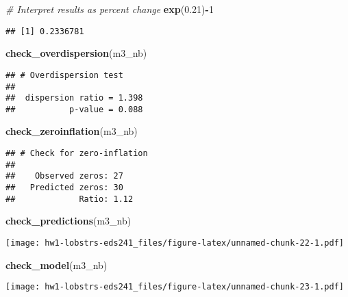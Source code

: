 \documentclass[
]{article}
\newenvironment{Shaded}{\begin{snugshade}}{\end{snugshade}}
\newcommand{\CommentTok}[1]{\textcolor[rgb]{0.56,0.35,0.01}{\textit{#1}}}
\newcommand{\DecValTok}[1]{\textcolor[rgb]{0.00,0.00,0.81}{#1}}
\newcommand{\FloatTok}[1]{\textcolor[rgb]{0.00,0.00,0.81}{#1}}
\newcommand{\FunctionTok}[1]{\textcolor[rgb]{0.13,0.29,0.53}{\textbf{#1}}}
\newcommand{\NormalTok}[1]{#1}
\newcommand{\SpecialCharTok}[1]{\textcolor[rgb]{0.81,0.36,0.00}{\textbf{#1}}}
\begin{document}
\begin{Shaded}
\begin{Highlighting}[]
\CommentTok{\# Interpret results as percent change}
\FunctionTok{exp}\NormalTok{(}\FloatTok{0.21}\NormalTok{)}\SpecialCharTok{{-}}\DecValTok{1}
\end{Highlighting}
\end{Shaded}

\begin{verbatim}
## [1] 0.2336781
\end{verbatim}

\begin{Shaded}
\begin{Highlighting}[]
\FunctionTok{check\_overdispersion}\NormalTok{(m3\_nb)}
\end{Highlighting}
\end{Shaded}

\begin{verbatim}
## # Overdispersion test
## 
##  dispersion ratio = 1.398
##           p-value = 0.088
\end{verbatim}

\begin{Shaded}
\begin{Highlighting}[]
\FunctionTok{check\_zeroinflation}\NormalTok{(m3\_nb)}
\end{Highlighting}
\end{Shaded}

\begin{verbatim}
## # Check for zero-inflation
## 
##    Observed zeros: 27
##   Predicted zeros: 30
##             Ratio: 1.12
\end{verbatim}

\begin{Shaded}
\begin{Highlighting}[]
\FunctionTok{check\_predictions}\NormalTok{(m3\_nb)}
\end{Highlighting}
\end{Shaded}

\texttt{[image: hw1-lobstrs-eds241\_files/figure-latex/unnamed-chunk-22-1.pdf]}

\begin{Shaded}
\begin{Highlighting}[]
\FunctionTok{check\_model}\NormalTok{(m3\_nb)}
\end{Highlighting}
\end{Shaded}

\texttt{[image: hw1-lobstrs-eds241\_files/figure-latex/unnamed-chunk-23-1.pdf]}
\end{document}
